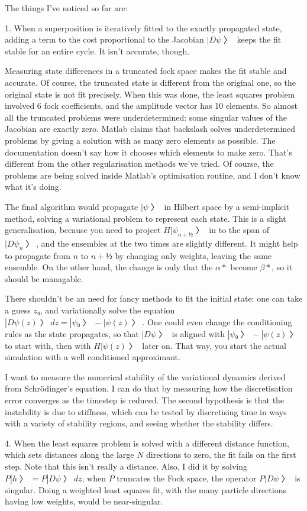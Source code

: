 The things I've noticed so far are:
\item{1.} When a superposition is iteratively fitted to the exactly propagated state, adding a term to the cost proportional to the Jacobian $|Dψ〉$ keeps the fit stable for an entire cycle.  It isn't accurate, though.

Measuring state differences in a truncated fock space makes the fit stable and accurate.  Of course, the truncated state is different from the original one, so the original state is not fit precisely.  When this was done, the least squares problem involved 6 fock coefficients, and the amplitude vector has 10 elements.  So almost all the truncated problems were underdetermined: some singular values of the Jacobian are exactly zero.  Matlab claims that backslash solves underdetermined problems by giving a solution with as many zero elements as possible.  The documentation doesn't say how it chooses which elements to make zero.  That's different from the other regularisation methods we've tried.  Of course, the problems are being solved inside Matlab's optimisation routine, and I don't know what it's doing.


The final algorithm would propagate $|ψ〉$ in Hilbert space by a semi-implicit method, solving a variational problem to represent each state.  This is a slight generalisation, because you need to project $H|ψ_{n+½}〉$ in to the span of $|Dψ_n〉$, and the ensembles at the two times are slightly different.  It might help to propagate from $n$ to $n+½$ by changing only weights, leaving the same ensemble.  On the other hand, the change is only that the $α*$ become $β*$, so it should be managable.

There shouldn't be an need for fancy methods to fit the initial state: one can take a guess $z₀$, and variationally solve the equation $|Dψ(z)〉dz=|ψ₀〉-|ψ(z)〉$.  One could even change the conditioning rules as the state propagates, so that $|Dψ〉$ is aligned with $|ψ₀〉-|ψ(z)〉$ to start with, then with $H|ψ(z)〉$ later on.  That way, you start the actual simulation with a well conditioned approximant.


I want to measure the numerical stability of the variational dynamics derived from Schrödinger's equation.  I can do that by measuring how the discretisation error converges as the timestep is reduced.  The second hypothesis is that the instability is due to stiffness, which can be tested by discretising time in ways with a variety of stability regions, and seeing whether the stability differs.



\item{4.} When the least squares problem is solved with a different distance function, which sets distances along the large $N$ directions to zero, the fit fails on the first step.  Note that this isn't really a distance.  Also, I did it by solving $P|h〉=P|Dψ〉dz$; when $P$ truncates the Fock space, the operator $P|Dψ〉$ is singular.  Doing a weighted least squares fit, with the many particle directions having low weights, would be near-singular.


\bye